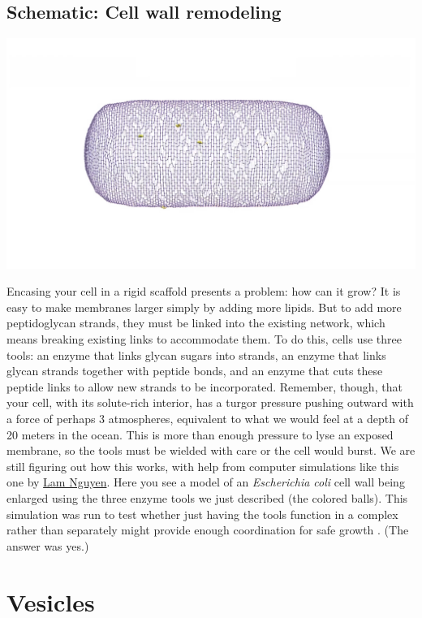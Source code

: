 \documentclass[]{tufte-book}
\begin{document}
\hypertarget{Cell_wall_remodeling}{%
\subsection*{Schematic: Cell wall remodeling}\label{Cell_wall_remodeling}}

\includegraphics{img/schematics/2_3_1}

Encasing your cell in a rigid scaffold presents a problem: how can it grow? It is easy to make membranes larger simply by adding more lipids. But to add more peptidoglycan strands, they must be linked into the existing network, which means breaking existing links to accommodate them. To do this, cells use three tools: an enzyme that links glycan sugars into strands, an enzyme that links glycan strands together with peptide bonds, and an enzyme that cuts these peptide links to allow new strands to be incorporated. Remember, though, that your cell, with its solute-rich interior, has a turgor pressure pushing outward with a force of perhaps 3 atmospheres, equivalent to what we would feel at a depth of 20 meters in the ocean. This is more than enough pressure to lyse an exposed membrane, so the tools must be wielded with care or the cell would burst. We are still figuring out how this works, with help from computer simulations like this one by \protect\hyperlink{lam_nguyen}{Lam Nguyen}. Here you see a model of an \emph{Escherichia coli} cell wall being enlarged using the three enzyme tools we just described (the colored balls). This simulation was run to test whether just having the tools function in a complex rather than separately might provide enough coordination for safe growth \citep{nguyen2015}. (The answer was yes.)

\hypertarget{vesicles}{%
\section{Vesicles}\label{vesicles}}
\end{document}
